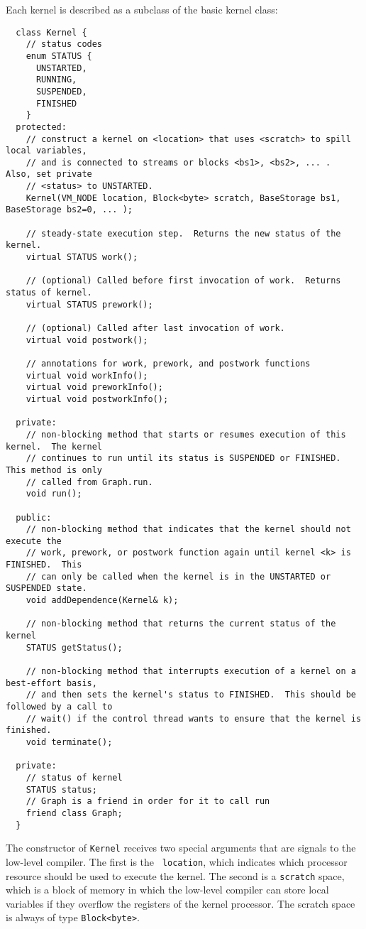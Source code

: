 \label{sec:kernels}

Each kernel is described as a subclass of the basic kernel class:
{\small
\begin{verbatim}
  class Kernel {
    // status codes
    enum STATUS {
      UNSTARTED,
      RUNNING,
      SUSPENDED,
      FINISHED
    }
  protected:
    // construct a kernel on <location> that uses <scratch> to spill local variables,
    // and is connected to streams or blocks <bs1>, <bs2>, ... .  Also, set private 
    // <status> to UNSTARTED.
    Kernel(VM_NODE location, Block<byte> scratch, BaseStorage bs1, BaseStorage bs2=0, ... );

    // steady-state execution step.  Returns the new status of the kernel.
    virtual STATUS work();

    // (optional) Called before first invocation of work.  Returns status of kernel.
    virtual STATUS prework();

    // (optional) Called after last invocation of work.
    virtual void postwork();

    // annotations for work, prework, and postwork functions
    virtual void workInfo();
    virtual void preworkInfo();
    virtual void postworkInfo();

  private:
    // non-blocking method that starts or resumes execution of this kernel.  The kernel 
    // continues to run until its status is SUSPENDED or FINISHED.  This method is only
    // called from Graph.run.
    void run();
   
  public:
    // non-blocking method that indicates that the kernel should not execute the
    // work, prework, or postwork function again until kernel <k> is FINISHED.  This
    // can only be called when the kernel is in the UNSTARTED or SUSPENDED state.
    void addDependence(Kernel& k);

    // non-blocking method that returns the current status of the kernel
    STATUS getStatus();

    // non-blocking method that interrupts execution of a kernel on a best-effort basis,
    // and then sets the kernel's status to FINISHED.  This should be followed by a call to 
    // wait() if the control thread wants to ensure that the kernel is finished.
    void terminate();

  private:
    // status of kernel
    STATUS status;
    // Graph is a friend in order for it to call run
    friend class Graph;
  }  
\end{verbatim}}
The constructor of {\tt Kernel} receives two special arguments that
are signals to the low-level compiler.  The first is the {\tt
location}, which indicates which processor resource should be used to
execute the kernel.  The second is a {\tt scratch} space, which is a
block of memory in which the low-level compiler can store local
variables if they overflow the registers of the kernel processor.  The
scratch space is always of type {\tt Block<byte>}.

